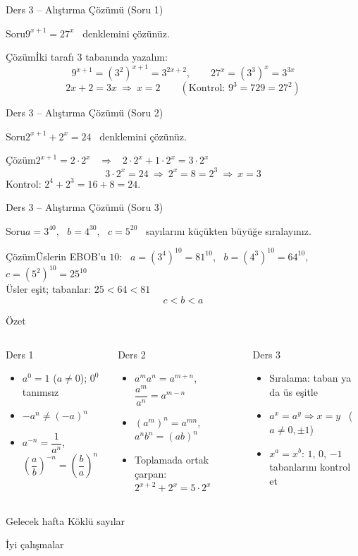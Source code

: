 \documentclass[aspectratio=169,11pt]{beamer}
\newcommand{\soru}[3]{%
\begin{frame}{#1}
  \begin{block}{Soru}\large #2\end{block}
  \pause
  \begin{exampleblock}{Çözüm}\large #3\end{exampleblock}
\end{frame}}
\begin{document}
\soru{Ders 3 -- Alıştırma Çözümü (Soru 1)}
{\(9^{x+1}=27^{x}\) \ denklemini çözünüz.}
{İki tarafı \(3\) tabanında yazalım:
\[9^{x+1}=(3^2)^{x+1}=3^{2x+2},\qquad 27^{x}=(3^3)^{x}=3^{3x}\]
\[2x+2=3x\ \Rightarrow\ x=2\qquad(\text{Kontrol: } 9^3=729=27^2)\]}

\soru{Ders 3 -- Alıştırma Çözümü (Soru 2)}
{\(2^{x+1}+2^{x}=24\) \ denklemini çözünüz.}
{\(2^{x+1}=2\cdot 2^x\) \ \(\Rightarrow\) \ \(2\cdot 2^x+1\cdot 2^x=3\cdot 2^x\)
\[3\cdot 2^x=24\ \Rightarrow\ 2^x=8=2^3\ \Rightarrow\ x=3\]
Kontrol: \(2^4+2^3=16+8=24\).}

\soru{Ders 3 -- Alıştırma Çözümü (Soru 3)}
{\(a=3^{40}\), \ \(b=4^{30}\), \ \(c=5^{20}\) \ sayılarını küçükten büyüğe sıralayınız.}
{Üslerin EBOB'u \(10\): \ \(a=(3^4)^{10}=81^{10}\), \ \(b=(4^3)^{10}=64^{10}\), \ \(c=(5^2)^{10}=25^{10}\)\\[4pt]
Üsler eşit; tabanlar: \(25<64<81\)
\[c<b<a\]}


\begin{frame}{Özet}
\begin{columns}[t]
\begin{block}{Ders 1}
\begin{itemize}
\item \(a^0=1\) (\(a\neq 0\)); \(0^0\) tanımsız
\item \(-a^n\neq(-a)^n\)
\item \(a^{-n}=\dfrac{1}{a^n}\), \ \(\left(\dfrac ab\right)^{-n}=\left(\dfrac ba\right)^{n}\)
\end{itemize}
\end{block}
\begin{block}{Ders 2}
\begin{itemize}
\item \(a^m a^n=a^{m+n}\), \ \(\dfrac{a^m}{a^n}=a^{m-n}\)
\item \((a^m)^n=a^{mn}\), \ \(a^nb^n=(ab)^n\)
\item Toplamada ortak çarpan: \(2^{x+2}+2^x=5\cdot 2^x\)
\end{itemize}
\end{block}
\begin{block}{Ders 3}
\begin{itemize}
\item Sıralama: taban ya da üs eşitle
\item \(a^x=a^y\Rightarrow x=y\) \ (\(a\neq 0,\pm1\))
\item \(x^a=x^b\): \(1\), \(0\), \(-1\) tabanlarını kontrol et
\end{itemize}
\end{block}
\end{columns}
\vspace{6pt}
\begin{alertblock}{Gelecek hafta}
Köklü sayılar
\end{alertblock}
\end{frame}

\begin{frame}
\centering\Large İyi çalışmalar
\end{frame}
\end{document}

